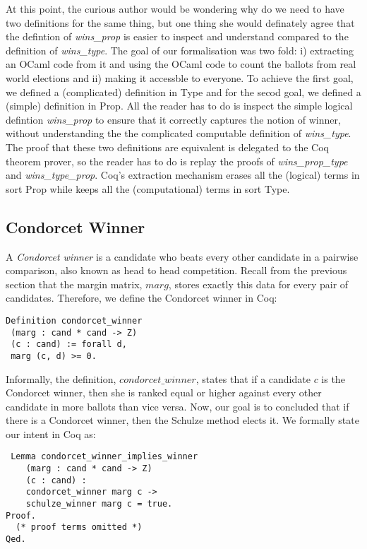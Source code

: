 \documentclass[compsoc,conference,a4paper,10pt,times]{IEEEtran}
\begin{document}
At this point, the curious author would be wondering why do we 
need to have two definitions for the same thing, but one thing 
she would definately agree that the defintion of \textit{wins\_prop} is easier to 
inspect and understand compared to the definition of \textit{wins\_type}.
  The goal 
of our formalisation was two fold: i) extracting an OCaml 
code from it and using the OCaml code 
to count the ballots from real world elections and ii)
making it accessble to everyone.  To achieve the 
first goal, we defined a (complicated) definition in Type 
and for the secod goal, we defined a (simple) definition in Prop. 
All the reader has to do is inspect the simple logical defintion 
\textit{wins\_prop} to ensure that it correctly captures the notion 
of winner,  without understanding the the complicated computable 
definition of \textit{wins\_type}.  The proof that these two definitions 
are equivalent is delegated to the Coq theorem prover, so the reader 
has to do is replay the proofs of  \textit{wins\_prop\_type} and 
\textit{wins\_type\_prop}.  Coq's extraction mechanism erases all the (logical) terms in sort Prop while 
keeps all the (computational) terms in sort Type. 


 \subsection{Condorcet Winner}
	A \textit{Condorcet winner} is a candidate who beats every other candidate in a 
	pairwise comparison, also known as head to head competition. 
	Recall from the previous section that the margin matrix, $marg$, 
	stores exactly this data for every pair of candidates.
	Therefore, we define the Condorcet winner in Coq:

\begin{verbatim}
Definition condorcet_winner 
 (marg : cand * cand -> Z) 
 (c : cand) := forall d, 
 marg (c, d) >= 0.
\end{verbatim}

  Informally, the definition,  $condorcet\_winner$, states that 
  if a candidate $c$  is the Condorcet winner, then she is
  ranked equal or higher against
  every other candidate in more ballots than vice versa. 
  Now, our goal is to concluded that if there is a 
  Condorcet winner, then the Schulze method
  elects it. We formally state our intent 
  in Coq as:
 	
\begin{verbatim}
 Lemma condorcet_winner_implies_winner 
    (marg : cand * cand -> Z)
    (c : cand) : 
    condorcet_winner marg c -> 
    schulze_winner marg c = true. 
Proof.
  (* proof terms omitted *)
Qed.
\end{verbatim}
\end{document}
